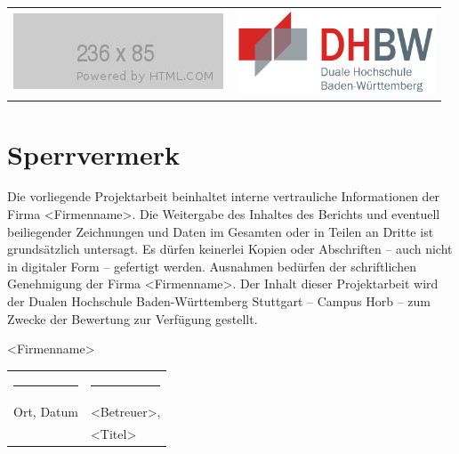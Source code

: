 \begin{minipage}{\textwidth}
\begin{longtable}[l]{p{8.2cm} p{5.4cm}}
	\includegraphics{Abbildungen/FirmenLogo.jpg} & \includegraphics[height=2.5cm]{Abbildungen/DHBW.png}
\end{longtable}
\enlargethispage{20mm}
\vspace*{6mm}	
\chapter*{Sperrvermerk}
Die vorliegende Projektarbeit beinhaltet interne vertrauliche Informationen der Firma <Firmenname>. Die Weitergabe des Inhaltes des Berichts und eventuell beiliegender Zeichnungen und Daten im Gesamten oder in Teilen an Dritte ist grundsätzlich untersagt. Es dürfen keinerlei Kopien oder Abschriften – auch nicht in digitaler Form – gefertigt werden. Ausnahmen bedürfen der schriftlichen Genehmigung der Firma <Firmenname>. Der Inhalt dieser Projektarbeit wird der Dualen Hochschule Baden-Württemberg Stuttgart – Campus Horb – zum Zwecke der Bewertung zur Verfügung gestellt.

\vspace{2cm}
<Firmenname>
\vspace{4cm}

\begin{tabular}{p{7.5cm}p{7.5cm}}
\rule{6cm}{0.4pt} & \rule{6cm}{0.4pt}\\
Ort, Datum & <Betreuer>,\\ & <Titel>
\end{tabular}
\end{minipage}

